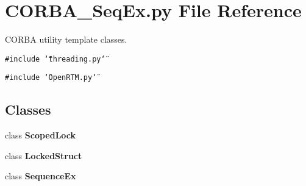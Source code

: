 \section{CORBA\_\-Seq\-Ex.py File Reference}
\label{CORBA__SeqEx_8py}
CORBA utility template classes. 

{\tt \#include \char`\"{}threading.py\char`\"{}}\par
{\tt \#include \char`\"{}Open\-RTM.py\char`\"{}}\par
\subsection*{Classes}
\begin{CompactItemize}
\item 
class {\bf Scoped\-Lock}
\item 
class {\bf Locked\-Struct}
\item 
class {\bf Sequence\-Ex}
\end{CompactItemize}
